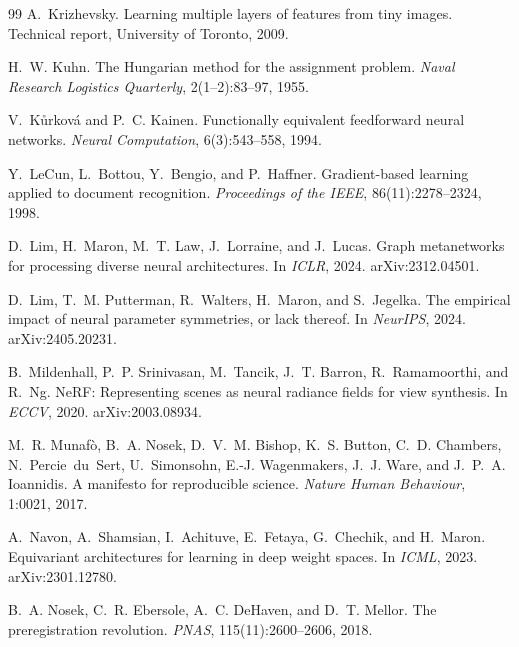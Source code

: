 \begin{thebibliography}{99}
A.~Krizhevsky.
\newblock Learning multiple layers of features from tiny images.
\newblock Technical report, University of Toronto, 2009.

H.~W. Kuhn.
\newblock The Hungarian method for the assignment problem.
\newblock \emph{Naval Research Logistics Quarterly}, 2(1--2):83--97, 1955.

V.~K\r{u}rkov\'a and P.~C. Kainen.
\newblock Functionally equivalent feedforward neural networks.
\newblock \emph{Neural Computation}, 6(3):543--558, 1994.

Y.~LeCun, L.~Bottou, Y.~Bengio, and P.~Haffner.
\newblock Gradient-based learning applied to document recognition.
\newblock \emph{Proceedings of the IEEE}, 86(11):2278--2324, 1998.

D.~Lim, H.~Maron, M.~T. Law, J.~Lorraine, and J.~Lucas.
\newblock Graph metanetworks for processing diverse neural architectures.
\newblock In \emph{ICLR}, 2024. arXiv:2312.04501.

D.~Lim, T.~M. Putterman, R.~Walters, H.~Maron, and S.~Jegelka.
\newblock The empirical impact of neural parameter symmetries, or lack thereof.
\newblock In \emph{NeurIPS}, 2024. arXiv:2405.20231.

B.~Mildenhall, P.~P. Srinivasan, M.~Tancik, J.~T. Barron, R.~Ramamoorthi, and R.~Ng.
\newblock NeRF: Representing scenes as neural radiance fields for view synthesis.
\newblock In \emph{ECCV}, 2020. arXiv:2003.08934.

M.~R. Munaf\`o, B.~A. Nosek, D.~V.~M. Bishop, K.~S. Button, C.~D. Chambers, N.~Percie~du~Sert,
U.~Simonsohn, E.-J. Wagenmakers, J.~J. Ware, and J.~P.~A. Ioannidis.
\newblock A manifesto for reproducible science.
\newblock \emph{Nature Human Behaviour}, 1:0021, 2017.

A.~Navon, A.~Shamsian, I.~Achituve, E.~Fetaya, G.~Chechik, and H.~Maron.
\newblock Equivariant architectures for learning in deep weight spaces.
\newblock In \emph{ICML}, 2023. arXiv:2301.12780.

B.~A. Nosek, C.~R. Ebersole, A.~C. DeHaven, and D.~T. Mellor.
\newblock The preregistration revolution.
\newblock \emph{PNAS}, 115(11):2600--2606, 2018.


\end{thebibliography}
